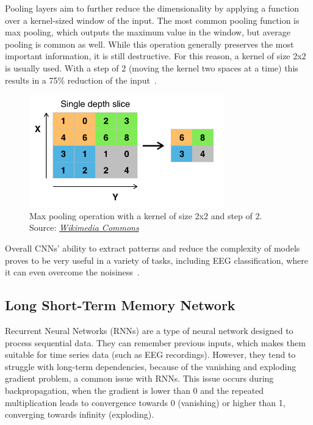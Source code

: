 \documentclass[english, he, bc, kiv, iso690alph, viewonly]{fasthesis}
\begin{document}
Pooling layers aim to further reduce the dimensionality by applying a function over a kernel-sized window of the input. The most common pooling function is max pooling, which outputs the maximum value in the window, but average pooling is common as well. While this operation generally preserves the most important information, it is still destructive. For this reason, a kernel of size 2x2 is usually used. With a step of 2 (moving the kernel two spaces at a time) this results in a 75\% reduction of the input~\cite{oshea:cnn:15}.

\begin{figure}
	\centering
	\includegraphics[width=0.75\textwidth]{fig/maxpool.png}
	\caption[Max pooling operation]{Max pooling operation with a kernel of size 2x2 and step of 2. Source: \href{https://commons.wikimedia.org/wiki/File:Max_pooling.png}{\textit{Wikimedia Commons}}}
\end{figure}

Overall CNNs' ability to extract patterns and reduce the complexity of models proves to be very useful in a variety of tasks, including EEG classification, where it can even overcome the noisiness~\cite{zhang:similar:20}.

\subsection{Long Short-Term Memory Network}

Recurrent Neural Networks (RNNs) are a type of neural network designed to process sequential data. They can remember previous inputs, which makes them suitable for time series data (such as EEG recordings). However, they tend to struggle with long-term dependencies, because of the vanishing and exploding gradient problem, a common issue with RNNs. This issue occurs during backpropagation, when the gradient is lower than 0 and the repeated multiplication leads to convergence towards 0 (vanishing) or higher than 1, converging towards infinity (exploding).
\end{document}
